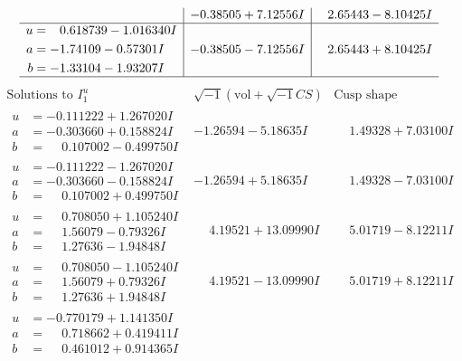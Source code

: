\documentclass[1p]{elsarticle_modified}
\theoremstyle{definition}
\newcommand{\I}{\sqrt{-1}}
\begin{document}
$$\begin{array}{c|c|c}
 & -0.38505 + 7.12556 I & \phantom{-}2.65443 - 8.10425 I \\ \hline\begin{aligned}
u &= \phantom{-}0.618739 - 1.016340 I \\
a &= -1.74109 - 0.57301 I \\
b &= -1.33104 - 1.93207 I\end{aligned}
 & -0.38505 - 7.12556 I & \phantom{-}2.65443 + 8.10425 I\\
 \hline 
 \end{array}$$\newpage$$\begin{array}{c|c|c}  
\text{Solutions to }I^u_{1}& \I (\text{vol} + \sqrt{-1}CS) & \text{Cusp shape}\\
 \hline 
\begin{aligned}
u &= -0.111222 + 1.267020 I \\
a &= -0.303660 + 0.158824 I \\
b &= \phantom{-}0.107002 - 0.499750 I\end{aligned}
 & -1.26594 - 5.18635 I & \phantom{-}1.49328 + 7.03100 I \\ \hline\begin{aligned}
u &= -0.111222 - 1.267020 I \\
a &= -0.303660 - 0.158824 I \\
b &= \phantom{-}0.107002 + 0.499750 I\end{aligned}
 & -1.26594 + 5.18635 I & \phantom{-}1.49328 - 7.03100 I \\ \hline\begin{aligned}
u &= \phantom{-}0.708050 + 1.105240 I \\
a &= \phantom{-}1.56079 - 0.79326 I \\
b &= \phantom{-}1.27636 - 1.94848 I\end{aligned}
 & \phantom{-}4.19521 + 13.09990 I & \phantom{-}5.01719 - 8.12211 I \\ \hline\begin{aligned}
u &= \phantom{-}0.708050 - 1.105240 I \\
a &= \phantom{-}1.56079 + 0.79326 I \\
b &= \phantom{-}1.27636 + 1.94848 I\end{aligned}
 & \phantom{-}4.19521 - 13.09990 I & \phantom{-}5.01719 + 8.12211 I \\ \hline\begin{aligned}
u &= -0.770179 + 1.141350 I \\
a &= \phantom{-}0.718662 + 0.419411 I \\
b &= \phantom{-}0.461012 + 0.914365 I\end{aligned}

\end{array}$$
\end{document}
